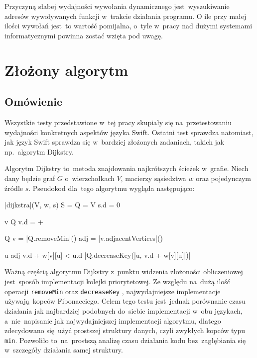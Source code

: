 \documentclass[mgr, shortabstract]{iithesis}
\newcommand{\swiftinline}[1]{
    \texttt{#1}
}
\begin{document}
Przyczyną słabej wydajności wywołania dynamicznego jest~wyszukiwanie adresów wywoływanych funkcji w~trakcie działania programu. O ile przy małej ilości wywołań jest~to wartość pomijalna, o~tyle w~pracy nad dużymi systemami informatycznymi powinna zostać wzięta pod uwagę.

\section{Złożony algorytm}

\subsection{Omówienie}

Wszystkie testy przedstawione w~tej pracy skupiały się na~przetestowaniu wydajności konkretnych aspektów języka Swift. Ostatni test sprawdza natomiast, jak język Swift sprawdza się w~bardziej złożonych zadaniach, takich jak np.~algorytm Dijkstry.

Algorytm Dijkstry to~metoda znajdowania najkrótszych ścieżek w~grafie. Niech dany będzie graf $G$ o~wierzchołkach $V$, macierzy sąsiedztwa $w$ oraz pojedynczym źródle $s$. Pseudokod dla~tego algorytmu wygląda następująco:

\begin{algorithm}
\begin{program}
    \PROC |dijkstra|(V, w, s)
        S = \emptyset {}
        Q = V 
        s.d = 0

        \FOR v \in Q \DO
            v.d = +\infty
        \END

        \WHILE Q \neq \emptyset
            v = |Q.removeMin|()
            adj = |v.adjacentVertices|()

            \FOR u \in adj \DO
                \IF v.d + w[v][u] < u.d
                    \THEN |Q.decreaseKey(|u, v.d + w[v][u]|)|
                \FI
            \END
        \END
\end{program}
\end{algorithm}

Ważną częścią algorytmu Dijkstry z~punktu widzenia złożoności obliczeniowej jest~sposób implementacji kolejki priorytetowej. Ze względu na~dużą ilość operacji \swiftinline{removeMin} oraz \swiftinline{decreaseKey}, najwydajniejsze implementacje używają kopców Fibonacciego. Celem tego testu jest~jednak porównanie czasu działania jak najbardziej podobnych do~siebie implementacji w~obu językach, a~nie~napisanie jak najwydajniejszej implementacji algorytmu, dlatego zdecydowano się użyć prostszej struktury danych, czyli zwykłych kopców typu \texttt{min}. Pozwoliło to~na~prostszą analizę czasu działania kodu bez~zagłębiania się w~szczegóły działania samej struktury.
\end{document}
